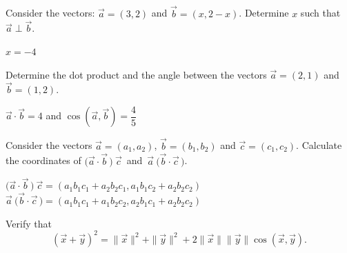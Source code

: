 \subsection*{}


\begin{Exercise}[difficulty = 1] Consider the vectors: $\vec{a}=(3,2)$ and $\vec{b}=(x,2-x)$. Determine $x$ such that $\vec{a} \perp \vec{b}$.

\end{Exercise}

\begin{Answer}\phantom{}
    $x=-4$
\end{Answer}
	
\begin{Exercise}[difficulty = 1] Determine the dot product and the angle between the vectors $\vec{a}=(2,1)$ and $\vec{b}=(1,2)$. 

\end{Exercise}

\begin{Answer}\phantom{}
    $\vec a \cdot \vec b = 4$ \quad and \quad $\cos \left(\vec{a},\vec{b} \right) = \dfrac{4}{5}$
\end{Answer}	

\begin{Exercise}[difficulty = 1] Consider the vectors $\vec{a}=(a_1,a_2)$, $\vec{b}=(b_1,b_2)$ and $\vec{c}=(c_1,c_2)$. Calculate the coordinates of $\bigl(\vec{a}\cdot\vec{b}\,\bigr)\ \vec{c}$ \,and\, $\vec{a}\ \bigl(\vec{b}\cdot\vec{c}\,\bigr)$.  

\end{Exercise}

\begin{Answer}\phantom{}
    $\bigl(\vec{a}\cdot\vec{b}\,\bigr)\ \vec{c} = (a_1 b_1 c_1 + a_2 b_2 c_1, a_1 b_1 c_2+a_2 b_2 c_2)$ \\
	$\vec{a}\ \bigl(\vec{b}\cdot\vec{c}\,\bigr) = (a_1 b_1 c_1 + a_1 b_2 c_2, a_2 b_1 c_1+a_2 b_2 c_2)$
\end{Answer}

\ifanalysis
	\begin{Exercise}[difficulty = 1, label=Bewijsoef] Verify that
	\[ \left(\vec{x}+\vec{y}\right)^2=\|\vec{x}\|^2 + \| \vec{y} \|^2 + 2\| \vec{x}\| \| \vec{y}\| \cos(\vec{x},\vec{y}).\] 
	
\end{Exercise}

